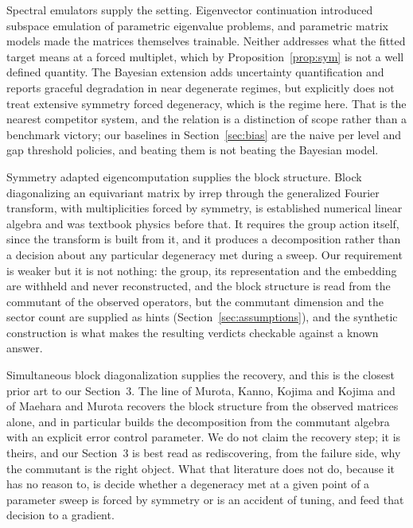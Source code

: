 \documentclass[11pt]{article}
\begin{document}
Spectral emulators supply the setting. Eigenvector continuation \cite{Frame2018}
introduced subspace emulation of parametric eigenvalue problems, and parametric
matrix models \cite{Cook2025} made the matrices themselves trainable. Neither
addresses what the fitted target means at a forced multiplet, which by
Proposition~\ref{prop:sym} is not a well defined quantity. The Bayesian
extension \cite{BPMM2025} adds uncertainty quantification and reports graceful
degradation in near degenerate regimes, but explicitly does not treat extensive
symmetry forced degeneracy, which is the regime here. That is the nearest
competitor system, and the relation is a distinction of scope rather than a
benchmark victory; our baselines in Section~\ref{sec:bias} are the naive per
level and gap threshold policies, and beating them is not beating the Bayesian
model.

Symmetry adapted eigencomputation supplies the block structure. Block
diagonalizing an equivariant matrix by irrep through the generalized Fourier
transform, with multiplicities forced by symmetry, is established numerical
linear algebra \cite{AMK2005,AMK2006} and was textbook physics before that. It
requires the group action itself, since the transform is built from it, and it
produces a decomposition rather than a decision about any particular degeneracy
met during a sweep. Our requirement is weaker but it is not nothing: the group,
its representation and the embedding are withheld and never reconstructed, and
the block structure is read from the commutant of the observed operators, but
the commutant dimension and the sector count are supplied as hints
(Section~\ref{sec:assumptions}), and the synthetic construction is what makes
the resulting verdicts checkable against a known answer.

Simultaneous block diagonalization supplies the recovery, and this is the
closest prior art to our Section~3. The line of Murota, Kanno, Kojima and Kojima
and of Maehara and Murota \cite{MKKK2010,MM2010,MM2011} recovers the block
structure from the observed matrices alone, and \cite{MM2011} in particular
builds the decomposition from the commutant algebra with an explicit error
control parameter. We do not claim the recovery step; it is theirs, and our
Section~3 is best read as rediscovering, from the failure side, why the
commutant is the right object. What that literature does not do, because it has
no reason to, is decide whether a degeneracy met at a given point of a parameter
sweep is forced by symmetry or is an accident of tuning, and feed that decision
to a gradient.
\end{document}
